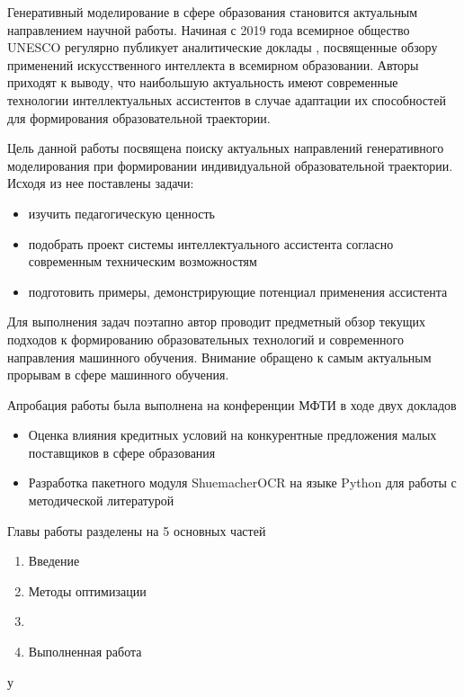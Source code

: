 Генеративный моделирование в сфере образования становится актуальным направлением научной работы. 
Начиная с 2019 года всемирное общество UNESCO регулярно публикует аналитические доклады \cite{unesco2019beijing}\cite{annuvs2024education},
посвященные обзору применений искусственного интеллекта в всемирном образовании. Авторы приходят к выводу, что
наибольшую актуальность имеют современные технологии интеллектуальных ассистентов в случае адаптации их способностей
для формирования образовательной траектории.

Цель данной работы посвящена поиску актуальных направлений генеративного моделирования при формировании индивидуальной образовательной траектории.
Исходя из нее поставлены задачи:
\begin{itemize}
    \item изучить педагогическую ценность 
    \item подобрать проект системы интеллектуального ассистента согласно современным техническим возможностям
    \item подготовить примеры, демонстрирующие потенциал применения ассистента 
\end{itemize}

Для выполнения задач поэтапно автор проводит предметный обзор текущих подходов к формированию образовательных технологий и
современного направления машинного обучения. Внимание обращено к самым актуальным прорывам в сфере машинного обучения.


Апробация работы была выполнена на конференции МФТИ в ходе двух докладов \begin{itemize}
    \item Оценка влияния кредитных условий на конкурентные предложения малых поставщиков в сфере образования
    \item Разработка пакетного модуля ShuemacherOCR на языке Python для работы с методической литературой    
\end{itemize}

Главы работы разделены на 5 основных частей \begin{enumerate}
    \item Введение
    \item Методы оптимизации
    \item 
    \item Выполненная работа
\end{enumerate}
у
